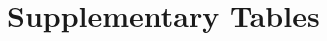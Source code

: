 \documentclass{article}
\begin{document}
\begin{ack}
\end{ack}


{\small


}



\appendix


\renewcommand{\tablename}{Supplementary Table}
\renewcommand{\figurename}{Supplementary Figure}

\newpage
\section{Supplementary Tables}





\end{document}
